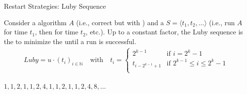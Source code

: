 \documentclass[t]{sdqbeamer}
\begin{document}
\begin{frame}{Restart Strategies: Luby Sequence}
\begin{theorem}
	Consider a  algorithm $A$ (i.e., correct but with ) and a  $S = \langle t_1, t_2, \ldots \rangle$ (i.e., run $A$ for time $t_1$, then for time $t_2$, etc.).	
	Up to a constant factor, the Luby sequence is the  to minimize the  until a run is successful.
	\begin{align*}
		Luby = u \cdot (t_i)_{i \in \mathbb{N}} \quad \text{with} \quad t_i = \begin{cases}
			2^{k-1} & \text{if $i = 2^k - 1$} \\
			t_{i-2^{k-1}+1} & \text{if $2^{k-1} \leq i \leq 2^k -1$} \\
		\end{cases}
	\end{align*}
\end{theorem}
\begin{example}
$1, 1, 2, 1, 1, 2, 4, 1, 1, 2, 1, 1, 2, 4, 8, \dots$
\end{example}
\end{frame}
		
\end{document}
